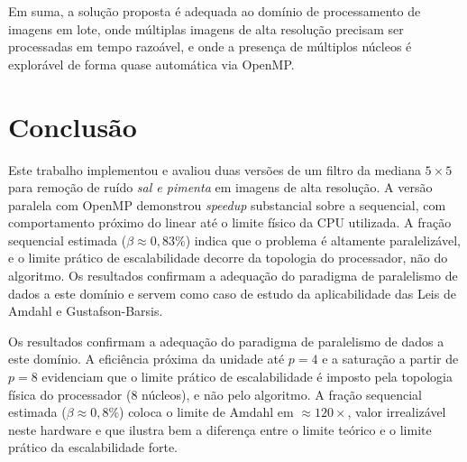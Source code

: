 \documentclass[12pt]{article}
\begin{document}
Em suma, a solução proposta é adequada ao domínio de processamento de
imagens em lote, onde múltiplas imagens de alta resolução precisam ser
processadas em tempo razoável, e onde a presença de múltiplos núcleos é
explorável de forma quase automática via OpenMP.

\newpage
\section{Conclusão}

Este trabalho implementou e avaliou duas versões de um filtro da mediana $5 \times 5$ para remoção de ruído \textit{sal e pimenta} em imagens de alta resolução. A versão paralela com OpenMP demonstrou \textit{speedup} substancial sobre a sequencial, com comportamento próximo do linear até o limite físico da CPU utilizada. A fração sequencial estimada ($\beta \approx 0{,}83\%$) indica que o problema é altamente paralelizável, e o limite prático de escalabilidade decorre da topologia do processador, não do algoritmo. Os resultados confirmam a adequação do paradigma de paralelismo de dados a este domínio e servem como caso de estudo da aplicabilidade das Leis de Amdahl e Gustafson-Barsis.

Os resultados confirmam a adequação do paradigma de paralelismo de dados a este domínio. A eficiência próxima da unidade até $p=4$ e a saturação a partir de $p=8$ evidenciam que o limite prático de escalabilidade é imposto pela topologia física do processador (8 núcleos), e não pelo algoritmo. A fração sequencial estimada ($\beta \approx 0{,}8\%$) coloca o limite de Amdahl em $\approx 120\times$, valor irrealizável neste hardware e que ilustra bem a diferença entre o limite teórico e o limite prático da escalabilidade forte.

\newpage


\end{document}
